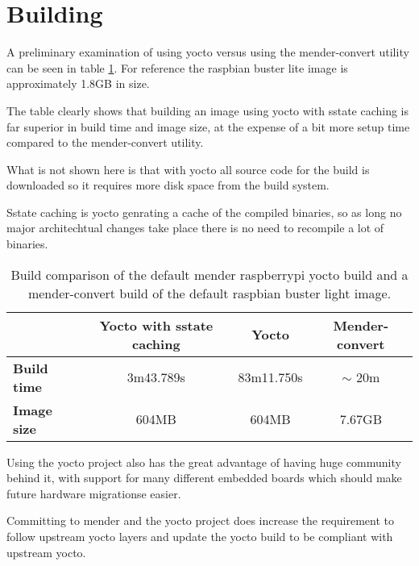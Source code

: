 \documentclass[../../main.tex]{subfiles}
\begin{document}
\section{Building}%
\label{sec:building}

A preliminary examination of using yocto versus using the mender-convert utility can be seen
in table \ref{tab:build_comp}. For reference the raspbian buster lite image is approximately
1.8GB in size.

The table clearly shows that building an image using yocto with sstate caching is far superior
in build time and image size, at the expense of a bit more setup time compared to the
mender-convert utility.

What is not shown here is that with yocto all source code for the build is downloaded so it
requires more disk space from the build system.

Sstate caching is yocto genrating a cache of the compiled binaries, so as long no major
architechtual changes take place there is no need to recompile a lot of binaries.


\begin{table}[h]
	\centering
	\caption{
		Build comparison of the default mender raspberrypi yocto build and a mender-convert build
		of the default raspbian buster light image.
	}
	\label{tab:build_comp}
	\begin{tabular}{l|ccc}
		& \textbf{Yocto with sstate caching}& \textbf{Yocto} & \textbf{Mender-convert}\\
		\hline
		\textbf{Build time}&3m43.789s&83m11.750s& $\sim$ 20m \\
		\textbf{Image size}&604MB&604MB&7.67GB\\
	\end{tabular}
\end{table}



Using the yocto project also has the great advantage of having huge community behind it, with support for many different embedded boards which should make future hardware migrationse easier.

Committing to mender and the yocto project does increase the requirement to follow upstream
yocto layers and update the yocto build to be compliant with upstream yocto.
\end{document}
